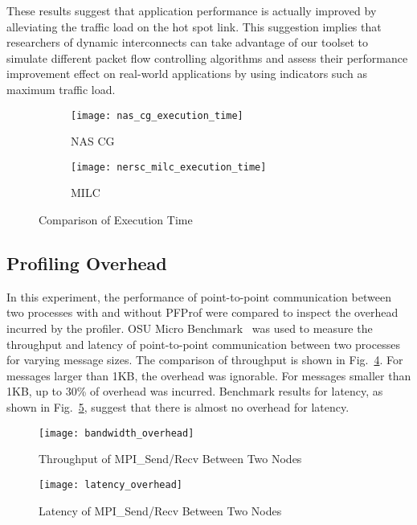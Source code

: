 These results suggest that application performance is actually improved
by alleviating the traffic load on the hot spot link. This suggestion
implies that researchers of dynamic interconnects can take advantage of
our toolset to simulate different packet flow controlling algorithms and
assess their performance improvement effect on real-world applications
by using indicators such as maximum traffic load.

\begin{figure}
    \begin{subfigure}{.47\linewidth}
        \centering
        \texttt{[image: nas\_cg\_execution\_time]}
        \caption{NAS CG}
        \label{fig:nas-cg-time}
    \end{subfigure}%
    \begin{subfigure}{.47\linewidth}
        \centering
        \texttt{[image: nersc\_milc\_execution\_time]}
        \caption{MILC}%
        \label{fig:nersc-milc-time}
    \end{subfigure}
    \caption{Comparison of Execution Time}%
    \label{fig:single-job-time}
\end{figure}

\subsection{Profiling Overhead}

In this experiment, the performance of point-to-point communication
between two processes with and without PFProf were compared to inspect
the overhead incurred by the profiler. OSU Micro
Benchmark~\autocite{omb} was used to measure the throughput and latency
of point-to-point communication between two processes for varying
message sizes. The comparison of throughput is shown in
Fig.~\ref{fig:bandwidth-overhead}. For messages larger than 1KB, the
overhead was ignorable. For messages smaller than 1KB, up to 30\% of
overhead was incurred. Benchmark results for latency, as shown in
Fig.~\ref{fig:latency-overhead}, suggest that there is almost no
overhead for latency.

\begin{figure}
    \centering
    \texttt{[image: bandwidth\_overhead]}
    \caption{Throughput of MPI\_Send/Recv Between Two Nodes}%
    \label{fig:bandwidth-overhead}
\end{figure}

\begin{figure}
    \centering
    \texttt{[image: latency\_overhead]}
    \caption{Latency of MPI\_Send/Recv Between Two Nodes}%
    \label{fig:latency-overhead}
\end{figure}

